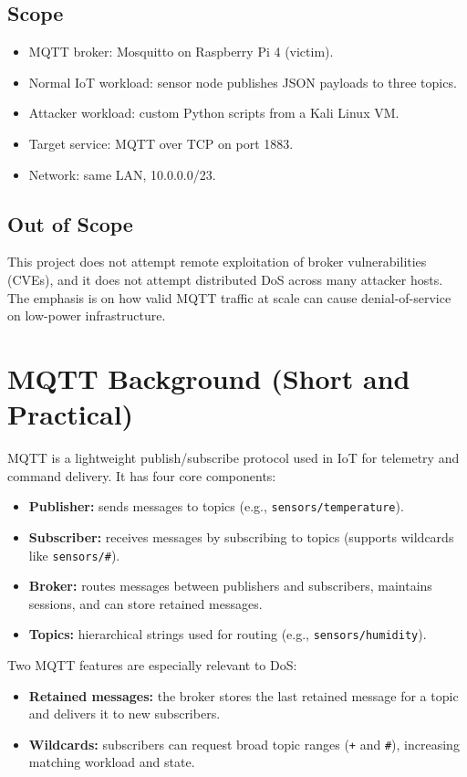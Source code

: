 \documentclass[11pt]{article}
\begin{document}
\subsection{Scope}
\begin{itemize}
  \item MQTT broker: Mosquitto on Raspberry Pi 4 (victim).
  \item Normal IoT workload: sensor node publishes JSON payloads to three topics.
  \item Attacker workload: custom Python scripts from a Kali Linux VM.
  \item Target service: MQTT over TCP on port 1883.
  \item Network: same LAN, 10.0.0.0/23.
\end{itemize}

\subsection{Out of Scope}
This project does not attempt remote exploitation of broker vulnerabilities (CVEs), and it does not attempt distributed DoS across many attacker hosts. The emphasis is on how valid MQTT traffic at scale can cause denial-of-service on low-power infrastructure.

\section{MQTT Background (Short and Practical)}
MQTT is a lightweight publish/subscribe protocol used in IoT for telemetry and command delivery. It has four core components:
\begin{itemize}
  \item \textbf{Publisher:} sends messages to topics (e.g., \texttt{sensors/temperature}).
  \item \textbf{Subscriber:} receives messages by subscribing to topics (supports wildcards like \texttt{sensors/\#}).
  \item \textbf{Broker:} routes messages between publishers and subscribers, maintains sessions, and can store retained messages.
  \item \textbf{Topics:} hierarchical strings used for routing (e.g., \texttt{sensors/humidity}).
\end{itemize}

Two MQTT features are especially relevant to DoS:
\begin{itemize}
  \item \textbf{Retained messages:} the broker stores the last retained message for a topic and delivers it to new subscribers.
  \item \textbf{Wildcards:} subscribers can request broad topic ranges (\texttt{+} and \texttt{\#}), increasing matching workload and state.
\end{itemize}
\end{document}
